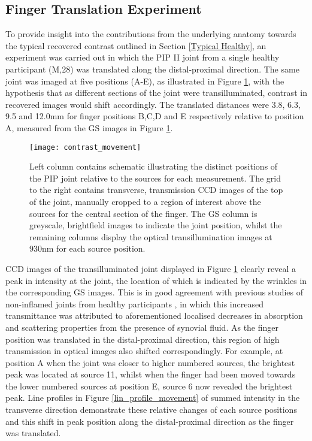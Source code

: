 \documentclass[twoside]{bhamthesis}
\theoremstyle{definition}
\begin{document}
\subsection{Finger Translation Experiment}

To provide insight into the contributions from the underlying anatomy towards the typical recovered contrast outlined in Section \ref{Typical Healthy}, an experiment was carried out in which the PIP II joint from a single healthy participant (M,28) was translated along the distal-proximal direction. The same joint was imaged at five positions (A-E), as illustrated in Figure \ref{contrast_movement}, with the hypothesis that as different sections of the joint were transilluminated, contrast in recovered images would shift accordingly. The translated distances were 3.8, 6.3, 9.5 and 12.0mm for finger positions B,C,D and E respectively relative to position A, measured from the GS images in Figure \ref{contrast_movement}.

\begin{figure}[!ht]
\centering\texttt{[image: contrast\_movement]}
\caption{Left column contains schematic illustrating the distinct positions of the PIP joint relative to the sources for each measurement. The grid to the right contains transverse, transmission CCD images of the top of the joint, manually cropped to a region of interest above the sources for the central section of the finger. The GS column is greyscale, brightfield images to indicate the joint position, whilst the remaining columns display the optical transillumination images at 930nm for each source position.}
\label{contrast_movement}
\end{figure}

CCD images of the transilluminated joint displayed in Figure \ref{contrast_movement} clearly reveal a peak in intensity at the joint, the location of which is indicated by the wrinkles in the corresponding GS images. This is in good agreement with previous studies of non-inflamed joints from healthy participants \cite{prapavat1995vivo,scheel2002assessment}, in which this increased transmittance was attributed to aforementioned localised decreases in absorption and scattering properties from the presence of synovial fluid. As the finger position was translated in the distal-proximal direction, this region of high transmission in optical images also shifted correspondingly. For example, at position A when the joint was closer to higher numbered sources, the brightest peak was located at source 11, whilst when the finger had been moved towards the lower numbered sources at position E, source 6 now revealed the brightest peak. Line profiles in Figure \ref{lin_profile_movement} of summed intensity in the transverse direction demonstrate these relative changes of each source positions and this shift in peak position along the distal-proximal direction as the finger was translated.
\end{document}
